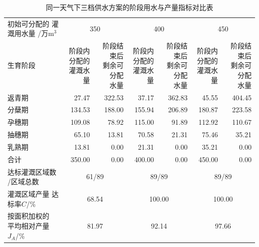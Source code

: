 \begin{table}[H]
 \centering\small
 \caption{同一天气下三档供水方案的阶段用水与产量指标对比表}
 \label{tab:irrigation89-supply-plan-process}
 \renewcommand{\arraystretch}{1.15}
 \begin{tabular}{lrrrrrr}
 \toprule
 \shortstack[l]{初始可分配的\\灌溉用水量\\/万\(\mathrm{m^3}\)} & \multicolumn{2}{c}{350} & \multicolumn{2}{c}{400} & \multicolumn{2}{c}{450}\\
 \cmidrule(lr){2-3}\cmidrule(lr){4-5}\cmidrule(lr){6-7}
 生育阶段 & \shortstack{阶段内\\分配的\\灌溉水量} & \shortstack{阶段结束后\\剩余可分配\\水量} & \shortstack{阶段内\\分配的\\灌溉水量} & \shortstack{阶段结束后\\剩余可分配\\水量} & \shortstack{阶段内\\分配的\\灌溉水量} & \shortstack{阶段结束后\\剩余可分配\\水量}\\
 \midrule
 返青期 & 27.47 & 322.53 & 37.17 & 362.83 & 45.55 & 404.45\\
 分蘖期 & 134.53 & 188.00 & 155.94 & 206.89 & 180.87 & 223.58\\
 孕穗期 & 109.08 & 78.92 & 115.00 & 91.89 & 112.92 & 110.67\\
 抽穗期 & 65.10 & 13.81 & 70.58 & 21.31 & 75.46 & 35.21\\
 乳熟期 & 13.81 & 0.00 & 21.31 & 0.00 & 35.21 & 0.00\\
 合计 & 350.00 & 0.00 & 400.00 & 0.00 & 450.00 & 0.00\\
 \midrule
 \shortstack[l]{达标灌溉区域数\\/区域总数} & \multicolumn{2}{c}{61/89} & \multicolumn{2}{c}{89/89} & \multicolumn{2}{c}{89/89}\\
 \shortstack[l]{灌溉区域产量\\达标率\(C\)/\%} & \multicolumn{2}{c}{68.54} & \multicolumn{2}{c}{100.00} & \multicolumn{2}{c}{100.00}\\
 \shortstack[l]{按面积加权的\\平均相对产量\\\(J_A\)/\%} & \multicolumn{2}{c}{81.97} & \multicolumn{2}{c}{92.14} & \multicolumn{2}{c}{97.66}\\
 \bottomrule
 \end{tabular}
\end{table}
